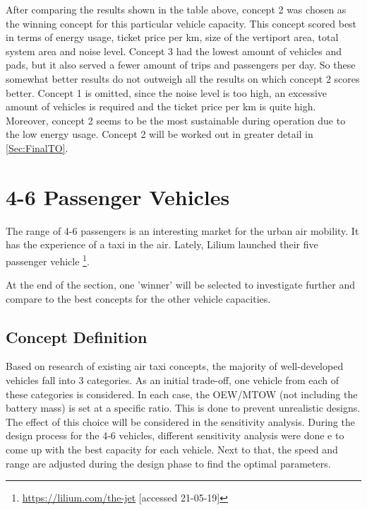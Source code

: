 After comparing the results shown in the table above, concept 2 was chosen as the winning concept for this particular vehicle capacity. This concept scored best in terms of energy usage, ticket price per km, size of the vertiport area, total system area and noise level. Concept 3 had the lowest amount of vehicles and pads, but it also served a fewer amount of trips and passengers per day. So these somewhat better results do not outweigh all the results on which concept 2 scores better. Concept 1 is omitted, since the noise level is too high, an excessive amount of vehicles is required and the ticket price per km is quite high. Moreover, concept 2 seems to be the most sustainable during operation due to the low energy usage. Concept 2 will be worked out in greater detail in \autoref{Sec:FinalTO}. 



\section{4-6 Passenger Vehicles}
The range of 4-6 passengers is an interesting market for the urban air mobility. It has the experience of a taxi in the air. Lately, Lilium launched their five passenger vehicle \footnote{\url{https://lilium.com/the-jet} [accessed 21-05-19]}. 


At the end of the section, one 'winner' will be selected to investigate further and compare to the best concepts for the other vehicle capacities. 

\subsection{Concept Definition}
Based on research of existing air taxi concepts, the majority of well-developed vehicles fall into 3 categories. As an initial trade-off, one vehicle from each of these categories is considered. In each case, the OEW/MTOW (not including the battery mass) is set at a specific ratio. This is done to prevent unrealistic designs. The effect of this choice will be considered in the sensitivity analysis. During the design process for the 4-6 vehicles, different sensitivity analysis were done e to come up with the best capacity for each vehicle. Next to that, the speed and range are adjusted during the design phase to find the optimal parameters. 


